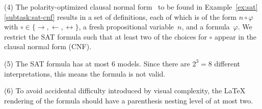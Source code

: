 
        \noindent(4) %
        The polarity-optimized clausal normal form~\cite{Tseytin70} 
        to be found in Example~\ref{ex:sat}\ref{subtask:sat-cnf} results in a set of definitions,
        each of which is of the form
        $n \circ \varphi$ with $\circ \in \{ \rightarrow, \leftarrow, \leftrightarrow \}$,
        a fresh propositional variable~$n$, and a formula~$\varphi$.
        We restrict the SAT formula such that at least two of the choices for
        $\circ$ appear in the clausal normal form (CNF). \smallskip
        
\noindent(5) %
        The SAT formula has at most $6$ models.
        Since there are $2^3 = 8$ different interpretations,
        this means the formula is not valid.\smallskip
        

      \noindent(6) %
        To avoid accidental difficulty introduced by visual complexity,
        the \LaTeX{} rendering of the formula should have a parenthesis nesting level of at most two.\smallskip

